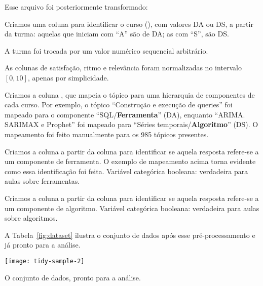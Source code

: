 Esse arquivo foi posteriormente transformado:
\begin{compactitem}
	\item Criamos uma coluna para identificar o curso (), com valores DA ou DS, a partir da turma: aquelas que iniciam com ``A'' são de DA; as com ``S'', são DS.
	
	\item A turma foi trocada por um valor numérico sequencial arbitrário.
	
	\item As colunas de satisfação, ritmo e relevância foram normalizadas no intervalo $[0,10]$, apenas por simplicidade.

	\item Criamos a coluna , que mapeia o tópico para uma hierarquia  de componentes de cada curso.
	Por exemplo, o tópico ``Construção e execução de queries'' foi mapeado para o componente ``SQL/\textbf{Ferramenta}'' (DA), enquanto ``ARIMA. SARIMAX e Prophet'' foi mapeado para ``Séries temporais/\textbf{Algoritmo}'' (DS).
	O mapeamento foi feito manualmente para os 985 tópicos presentes.

	\item Criamos a coluna  a partir da coluna  para identificar se aquela resposta refere-se a um componente de ferramenta.
	O exemplo de mapeamento acima torna evidente como essa identificação foi feita.
	Variável categórica booleana: verdadeira para aulas sobre ferramentas.
	
	\item Criamos a coluna  a partir da coluna  para identificar se aquela resposta refere-se a um componente de algoritmo.
	Variável categórica booleana: verdadeira para aulas sobre algoritmos.
\end{compactitem}

A Tabela~\ref{fig:dataset} ilustra o conjunto de dados após esse pré-processamento e já pronto para a análise.

\begin{table}
	\centering
	\texttt{[image: tidy-sample-2]}
	\caption{O conjunto de dados, pronto para a análise.}
	\label{fig:dataset}
\end{table}